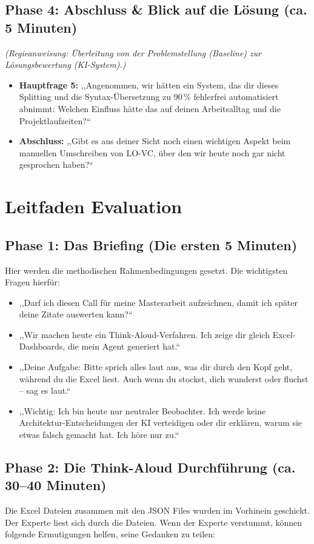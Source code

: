 \documentclass[12pt, a4paper, oneside]{book}
\begin{document}
\subsection*{Phase 4: Abschluss \& Blick auf die Lösung (ca. 5 Minuten)}
\textit{(Regieanweisung: Überleitung von der Problemstellung (Baseline) zur Lösungsbewertung (KI-System).)}

\begin{itemize}
    \item \textbf{Hauptfrage 5:} ,,Angenommen, wir hätten ein System, das dir dieses Splitting und die Syntax-Übersetzung zu 90\,\% fehlerfrei automatisiert abnimmt: Welchen Einfluss hätte das auf deinen Arbeitsalltag und die Projektlaufzeiten?``
    \item \textbf{Abschluss:} ,,Gibt es aus deiner Sicht noch einen wichtigen Aspekt beim manuellen Umschreiben von LO-VC, über den wir heute noch gar nicht gesprochen haben?``
\end{itemize}
\section{Leitfaden Evaluation}
\label{leitfaden_evaluation}
\subsection*{Phase 1: Das Briefing (Die ersten 5 Minuten)}
Hier werden die methodischen Rahmenbedingungen gesetzt. Die wichtigsten Fragen hierfür:

\begin{itemize}
    \item ,,Darf ich diesen Call für meine Masterarbeit aufzeichnen, damit ich später deine Zitate auswerten kann?``
    \item ,,Wir machen heute ein Think-Aloud-Verfahren. Ich zeige dir gleich Excel-Dashboards, die mein Agent generiert hat.``
    \item ,,Deine Aufgabe: Bitte sprich alles laut aus, was dir durch den Kopf geht, während du die Excel liest. Auch wenn du stockst, dich wunderst oder fluchst -- sag es laut.``
    \item ,,Wichtig: Ich bin heute nur neutraler Beobachter. Ich werde keine Architektur-Entscheidungen der KI verteidigen oder dir erklären, warum sie etwas falsch gemacht hat. Ich höre nur zu.``
\end{itemize}

\subsection*{Phase 2: Die Think-Aloud Durchführung (ca. 30--40 Minuten)}
Die Excel Dateien zusammen mit den JSON Files wurden im Vorhinein geschickt. Der Experte liest sich durch die Dateien. Wenn der Experte verstummt, können folgende Ermutigungen helfen, seine Gedanken zu teilen:
\end{document}
